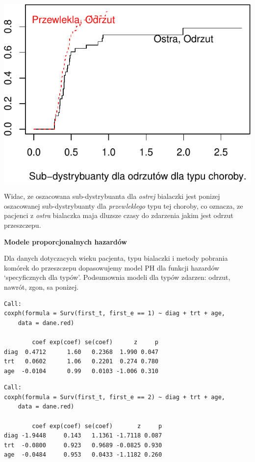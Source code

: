 \documentclass[]{article}
\begin{document}
\begin{center}\includegraphics{figure/beamer-unnamed-chunk-8-1} \end{center}

Widac, ze oszacowana sub-dystrybuanta dla \emph{ostrej} bialaczki jest
ponizej oszacowanej sub-dystrybuanty dla \emph{przewleklego} typu tej
choroby, co oznacza, ze pacjenci z \emph{ostra} bialaczka maja dluzsze
czasy do zdarzenia jakim jest odrzut przeszczepu.

\newpage
\textbf{Modele proporcjonalnych hazardów}

Dla danych dotyczacych wieku pacjenta, typu bialaczki i metody pobrania
komórek do przeszczepu dopasowujemy model PH dla funkcji hazardów
`specyficznych dla typów'. Podsumownia modeli dla typów zdarzen: odrzut,
nawrót, zgon, sa ponizej.

\begin{verbatim}
Call:
coxph(formula = Surv(first_t, first_e == 1) ~ diag + trt + age, 
    data = dane.red)

        coef exp(coef) se(coef)      z     p
diag  0.4712      1.60   0.2368  1.990 0.047
trt   0.0602      1.06   0.2201  0.274 0.780
age  -0.0104      0.99   0.0103 -1.006 0.310
\end{verbatim}

\begin{verbatim}
Call:
coxph(formula = Surv(first_t, first_e == 2) ~ diag + trt + age, 
    data = dane.red)

        coef exp(coef) se(coef)       z     p
diag -1.9448     0.143   1.1361 -1.7118 0.087
trt  -0.0800     0.923   0.9689 -0.0825 0.930
age  -0.0484     0.953   0.0433 -1.1182 0.260
\end{verbatim}
\end{document}
